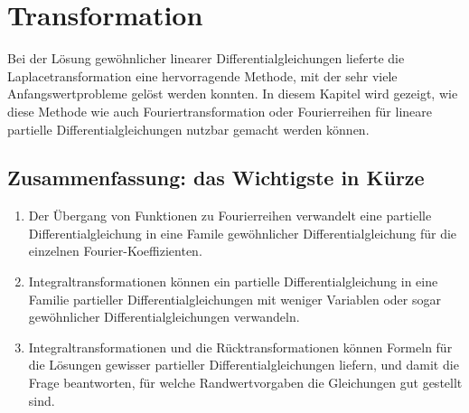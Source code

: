 %
%
%
\chapter{Transformation}
Bei der Lösung gewöhnlicher linearer Differentialgleichungen lieferte die
Laplacetransformation eine hervorragende Methode, mit der sehr
viele Anfangswertprobleme gelöst werden konnten.
In diesem Kapitel wird gezeigt, wie diese Methode wie auch
Fouriertransformation oder Fourierreihen 
für lineare partielle Differentialgleichungen nutzbar gemacht
werden können.







\section{Zusammenfassung: das Wichtigste in Kürze}
\begin{enumerate}
\item Der Übergang von Funktionen zu Fourierreihen verwandelt
eine partielle Differentialgleichung in eine Famile gewöhnlicher
Differentialgleichung für die einzelnen Fourier-Koeffizienten.
\item Integraltransformationen können ein partielle Differentialgleichung
in eine Familie partieller Differentialgleichungen mit weniger Variablen
oder sogar gewöhnlicher Differentialgleichungen verwandeln.
\item Integraltransformationen und die Rücktransformationen können
Formeln für die Lösungen gewisser partieller Differentialgleichungen
liefern, und damit die Frage beantworten, für welche Randwertvorgaben
die Gleichungen gut gestellt sind.
\end{enumerate}
